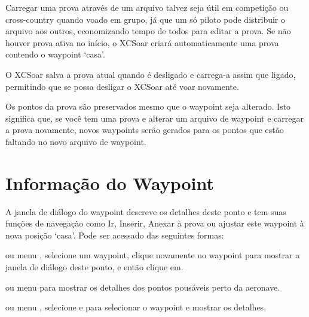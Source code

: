 Carregar uma prova através de um arquivo talvez seja útil em competição ou cross-country quando voado em grupo, já que um só piloto pode distribuir o arquivo aos outros, economizando tempo de todos para editar a prova.  \tip Se não houver prova ativa no início, o XCSoar criará automaticamente uma prova contendo o waypoint ‘casa’.

O XCSoar salva a prova atual quando é desligado e carrega-a assim que ligado, permitindo que se possa desligar o XCSoar até voar novamente.

Os pontos da prova são preservados mesmo que o waypoint seja alterado.  Isto significa que, se você tem uma prova e alterar um arquivo de waypoint e carregar a prova novamente, novos waypoints serão gerados para os pontos que estão faltando no novo arquivo de waypoint.



\section{Informação do Waypoint }

A janela de diálogo do waypoint descreve os detalhes deste ponto e tem suas funções de navegação como Ir, Inserir, Anexar à prova ou ajustar este waypoint à nova posição ‘casa’.  Pode ser acessado das seguintes formas:

ou menu \blink{},
selecione um waypoint, clique novamente no waypoint para mostrar a janela de diálogo deste ponto, e então clique em.

ou menu \blink{}
para mostrar os detalhes dos pontos pousáveis perto da aeronave.

ou menu \blink{}
, selecione e para selecionar o waypoint e mostrar os detalhes.

